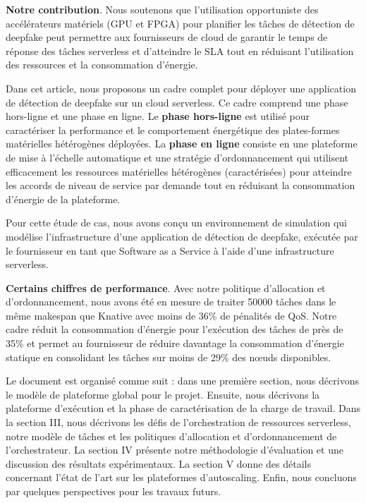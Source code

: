 \textbf{Notre contribution}. Nous soutenons que l'utilisation opportuniste des accélérateurs matériels (GPU et FPGA) pour planifier les tâches de détection de deepfake peut permettre aux fournisseurs de cloud de garantir le temps de réponse des tâches serverless et d'atteindre le SLA tout en réduisant l'utilisation des ressources et la consommation d'énergie.

Dans cet article, nous proposons un cadre complet pour déployer une application de détection de deepfake sur un cloud serverless. Ce cadre comprend une phase hors-ligne et une phase en ligne. Le \textbf{phase hors-ligne} est utilisé pour caractériser la performance et le comportement énergétique des plates-formes matérielles hétérogènes déployées. La \textbf{phase en ligne} consiste en une plateforme de mise à l'échelle automatique et une stratégie d'ordonnancement qui utilisent efficacement les ressources matérielles hétérogènes (caractérisées) pour atteindre les accords de niveau de service par demande tout en réduisant la consommation d'énergie de la plateforme. 

Pour cette étude de cas, nous avons conçu un environnement de simulation qui modélise l'infrastructure d'une application de détection de deepfake, exécutée par le fournisseur en tant que Software as a Service à l'aide d'une infrastructure serverless.

\textbf{Certains chiffres de performance}. Avec notre politique d'allocation et d'ordonnancement, nous avons été en mesure de traiter 50000 tâches dans le même makespan que Knative avec moins de 36\% de pénalités de QoS. Notre cadre réduit la consommation d'énergie pour l'exécution des tâches de près de 35\% et permet au fournisseur de réduire davantage la consommation d'énergie statique en consolidant les tâches sur moins de 29\% des nœuds disponibles.

Le document est organisé comme suit : dans une première section, nous décrivons le modèle de plateforme global pour le projet. Ensuite, nous décrivons la plateforme d'exécution et la phase de caractérisation de la charge de travail. Dans la section III, nous décrivons les défis de l'orchestration de ressources serverless, notre modèle de tâches et les politiques d'allocation et d'ordonnancement de l'orchestrateur. La section IV présente notre méthodologie d'évaluation et une discussion des résultats expérimentaux. La section V donne des détails concernant l'état de l'art sur les plateformes d'autoscaling. Enfin, nous concluons par quelques perspectives pour les travaux futurs.

